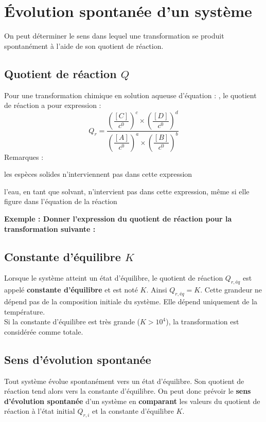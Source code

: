 \documentclass[a4paper,11pt,fleqn]{article}%
\begin{document}
\section{Évolution spontanée d'un système}
On peut déterminer le sens dans lequel une transformation se produit spontanément à l'aide de son quotient de réaction.
	\subsection{Quotient de réaction $Q$}
	Pour une transformation chimique en solution aqueuse d'équation : , le quotient de réaction a pour expression :
	$$Q_r = \dfrac{\left( \dfrac{[C]}{c^0}\right)^c \times \left( \dfrac{[D]}{c^0}\right)^d}{\left( \dfrac{[A]}{c^0}\right)^a \times \left( \dfrac{[B]}{c^0}\right)^b}$$
	Remarques :
	\begin{itemize*}
		\item les espèces solides n'interviennent pas dans cette expression
		\item l'eau, en tant que solvant, n'intervient pas dans cette expression, même si elle figure dans l'équation de la réaction
	\end{itemize*}
	\textbf{Exemple : Donner l'expression du quotient de réaction pour la transformation suivante :}
	\vspace*{2cm}
	
	\subsection{Constante d'équilibre $K$}
	Lorsque le système atteint un état d'équilibre, le quotient de réaction $Q_{r,éq}$ est appelé \textbf{constante d'équilibre} et est  noté $K$. Ainsi $Q_{r,éq} = K$. Cette grandeur ne dépend pas de la composition initiale du système. Elle dépend uniquement de la température.\\
	Si la constante d'équilibre est très grande ($K>10^4$), la transformation est considérée comme totale.
	
	\subsection{Sens d'évolution spontanée}
	Tout système évolue spontanément vers un état d'équilibre. Son quotient de réaction tend alors vers la constante d'équilibre. On peut donc prévoir le \textbf{sens d'évolution spontanée} d'un système en \textbf{comparant} les valeurs du quotient de réaction à l'état initial $Q_{r,i}$ et la constante d'équilibre $K$.
\newpage
\end{document}
